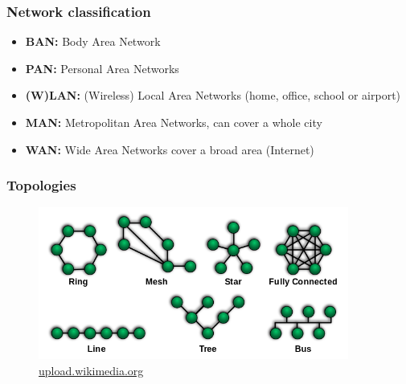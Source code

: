   \begin{frame}
    \frametitle{Network classification}
      \begin{itemize}
        \item \textbf{BAN:} Body Area Network\pause
        \item \textbf{PAN:} Personal Area Networks\pause
        \item \textbf{(W)LAN:} (Wireless) Local Area Networks (home, office, school or airport)\pause
        \item \textbf{MAN:} Metropolitan Area Networks, can cover a whole city\pause
        \item \textbf{WAN:} Wide Area Networks cover a broad area (Internet)
      \end{itemize}
  \end{frame}
  \begin{frame}
    \frametitle{Topologies}
    \begin{figure}[t]
      \centering
      \includegraphics[height=5cm]{./imgs/topologies.png}
      \caption{\color{blue}\href{https://upload.wikimedia.org/wikipedia/commons/thumb/9/97/NetworkTopologies.svg/640px-NetworkTopologies.svg.png}{upload.wikimedia.org}}
      \label{fig:topologies}
    \end{figure}
  \end{frame}

